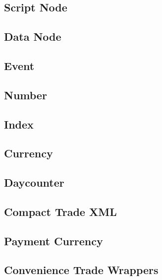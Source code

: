 \documentclass[12pt, a4paper]{article}
\begin{document}
\subsection{Script Node}\label{scriptNode}


\subsection{Data Node}\label{dataNode}


\subsection{Event}\label{event}


\subsection{Number}


\subsection{Index}\label{data_index}


\subsection{Currency}


\subsection{Daycounter}


\subsection{Compact Trade XML}\label{compactXml}


\subsection{Payment Currency}\label{sss:payccy_st}


\subsection{Convenience Trade Wrappers}

\end{document}
